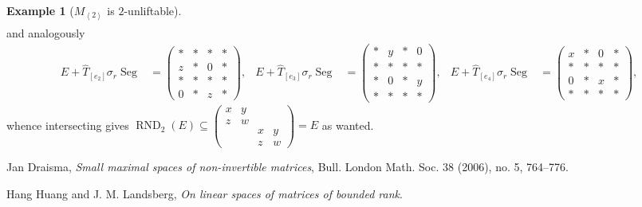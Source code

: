 \documentclass[a4paper,10pt]{article}
\def\gener#1{\left\langle#1\right\rangle}
\def\mtrx#1{\begin{pmatrix}#1\end{pmatrix}}
\DeclareMathOperator{\RND}{RND}
\DeclareMathOperator{\Seg}{Seg}
\theoremstyle{definition}
\newtheorem{example}[theorem]{Example}
\theoremstyle{remark}
\begin{document}
\begin{example}[$M_{\gener2}$ is $2$-unliftable]
\begin{align*}
    \end{align*}
    and analogously
    \begin{align*}
        E+\hat T_{[e_2]}\sigma_r\Seg &= \mtrx{
            *&*&*&*\\
            z&*&0&*\\
            *&*&*&*\\
            0&*&z&*
        },&
        E+\hat T_{[e_3]}\sigma_r\Seg &= \mtrx{
            *&y&*&0\\
            *&*&*&*\\
            *&0&*&y\\
            *&*&*&*
        },&
        E+\hat T_{[e_4]}\sigma_r\Seg &= \mtrx{
            x&*&0&*\\
            *&*&*&*\\
            0&*&x&*\\
            *&*&*&*
        },
    \end{align*}
    whence intersecting gives $\RND_2(E)\subseteq \mtrx{x&y&&\\z&w&&\\&&x&y\\&&z&w} = E$ as wanted.
\end{example}

\begin{thebibliography}{99}
    Jan Draisma,
    \textit{Small maximal spaces of non-invertible matrices},
    Bull. London Math. Soc. 38 (2006), no. 5,
    764--776.

    Hang Huang and J. M. Landsberg,
    \textit{On linear spaces of matrices of bounded rank}.

\end{thebibliography}
\end{document}
